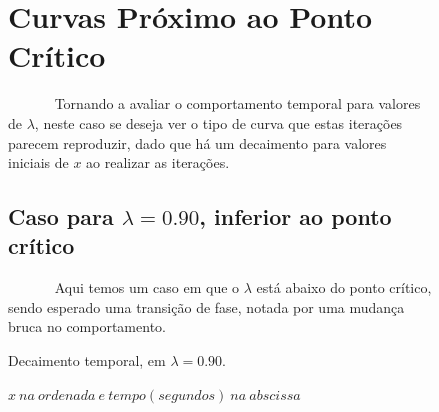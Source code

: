 \documentclass[pdftex,12pt,a4paper]{article}
\begin{document}
\begin{figure}
\section{Curvas Próximo ao Ponto Crítico}
~~~~~~ Tornando a avaliar o comportamento temporal para valores de $\lambda$, neste caso se deseja ver o tipo de curva que estas iterações parecem reproduzir, dado que há um decaimento para valores iniciais de $x$ ao realizar as iterações.

\subsection{Caso para $\lambda = 0.90$, inferior ao ponto crítico}
~~~~~~ Aqui temos um caso em que o $\lambda$ está abaixo do ponto crítico, sendo esperado uma transição de fase, notada por uma mudança bruca no comportamento.

\centering
\caption{Decaimento temporal, em $\lambda = 0.90$.}
\caption*{$x\ na\ ordenada\ e\ tempo(segundos)\ na\ abscissa$}
\end{figure}
\end{document}
